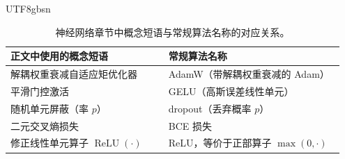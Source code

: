 \documentclass[english, 12pt, a4paper, elec, utf8, a-2b, online]{aaltothesis}
\begin{document}
\begin{CJK*}{UTF8}{gbsn}
\begin{table}[h]
\centering
\begin{tabular}{p{0.45\linewidth} p{0.5\linewidth}}
\toprule
\textbf{正文中使用的概念短语} & \textbf{常规算法名称} \\
\midrule
解耦权重衰减自适应矩优化器 & AdamW（带解耦权重衰减的 Adam） \\
平滑门控激活 & GELU（高斯误差线性单元） \\
随机单元屏蔽（率 $p$） & dropout（丢弃概率 $p$） \\
二元交叉熵损失 & BCE 损失 \\
修正线性单元算子 $\operatorname{ReLU}(\cdot)$ & ReLU，等价于正部算子 $\max(0,\cdot)$ \\
\bottomrule
\end{tabular}
\caption{神经网络章节中概念短语与常规算法名称的对应关系。}
\end{table}


\thesisbibliography

\ifXeTeX
\else
\end{CJK*}
\fi
\end{document}
